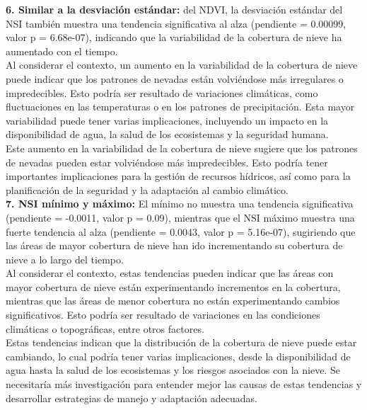 {\textbf{6.	Similar a la desviación estándar:} del NDVI, la desviación estándar del NSI también muestra una tendencia significativa al alza (pendiente = 0.00099, valor p = 6.68e-07), indicando que la variabilidad de la cobertura de nieve ha aumentado con el tiempo.\\

Al considerar el contexto, un aumento en la variabilidad de la cobertura de nieve puede indicar que los patrones de nevadas están volviéndose más irregulares o impredecibles. Esto podría ser resultado de variaciones climáticas, como fluctuaciones en las temperaturas o en los patrones de precipitación. Esta mayor variabilidad puede tener varias implicaciones, incluyendo un impacto en la disponibilidad de agua, la salud de los ecosistemas y la seguridad humana. \\

Este aumento en la variabilidad de la cobertura de nieve sugiere que los patrones de nevadas pueden estar volviéndose más impredecibles. Esto podría tener importantes implicaciones para la gestión de recursos hídricos, así como para la planificación de la seguridad y la adaptación al cambio climático.   \\

\textbf{7.	NSI mínimo y máximo:} El mínimo no muestra una tendencia significativa (pendiente = -0.0011, valor p = 0.09), mientras que el NSI máximo muestra una fuerte tendencia al alza (pendiente = 0.0043, valor p = 5.16e-07), sugiriendo que las áreas de mayor cobertura de nieve han ido incrementando su cobertura de nieve a lo largo del tiempo.\\

Al considerar el contexto, estas tendencias pueden indicar que las áreas con mayor cobertura de nieve están experimentando incrementos en la cobertura, mientras que las áreas de menor cobertura no están experimentando cambios significativos. Esto podría ser resultado de variaciones en las condiciones climáticas o topográficas, entre otros factores.\\

Estas tendencias indican que la distribución de la cobertura de nieve puede estar cambiando, lo cual podría tener varias implicaciones, desde la disponibilidad de agua hasta la salud de los ecosistemas y los riesgos asociados con la nieve. Se necesitaría más investigación para entender mejor las causas de estas tendencias y desarrollar estrategias de manejo y adaptación adecuadas.\\

}
